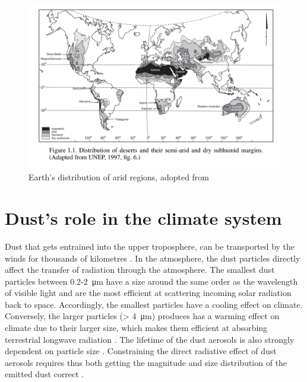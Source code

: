 \begin{figure}[htpb]
    \centering
    \includegraphics[width=\textwidth]{texfiles/figs/Desert_distrubtion.PNG}
    \caption{Earth's distribution of arid regions, adopted from \textcite{williams_climate_2014}}
    \label{fig:desert_distrubtion}
\end{figure}

\section{Dust's role in the climate system}\label{seq:physics_of_dust}
Dust that gets entrained into the upper troposphere, can be transported by the winds for thousands of kilometres \parencite{yumimoto_elevated_2009}. 
In the atmosphere, the dust particles directly affect the transfer of radiation through the atmosphere. 
The smallest dust particles between 0.2-\SI{2}{\micro\metre} have a size around the same order as the wavelength of visible light and are the most efficient at scattering incoming solar radiation back to space. 
Accordingly, the smallest particles have a cooling effect on climate. 
Conversely, the larger particles (> \SI{4}{\micro\metre}) produces has a warming effect on climate due to their larger size, which makes them efficient at absorbing terrestrial longwave radiation \parencite{choobari2014global}.
The lifetime of the dust aerosols is also strongly dependent on particle size \parencite{mahowald2014size}. Constraining the direct radiative effect of dust aerosols requires thus both getting the magnitude and size distribution of the emitted dust correct \parencite{adebiyi2020dust}.

